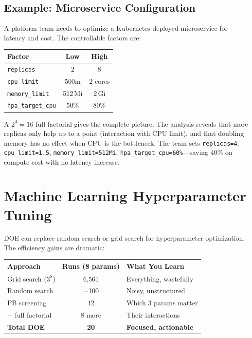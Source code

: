 \documentclass[11pt]{book}
\begin{document}
\subsection{Example: Microservice Configuration}

A platform team needs to optimize a Kubernetes-deployed microservice for latency
and cost. The controllable factors are:

\begin{center}
\begin{tabular}{lcc}
\toprule
Factor & Low & High \\
\midrule
\texttt{replicas} & 2 & 8 \\
\texttt{cpu\_limit} & 500m & 2 cores \\
\texttt{memory\_limit} & 512\,Mi & 2\,Gi \\
\texttt{hpa\_target\_cpu} & 50\% & 80\% \\
\bottomrule
\end{tabular}
\end{center}

A $2^4 = 16$ full factorial gives the complete picture. The analysis reveals
that more replicas only help up to a point (interaction with CPU limit), and
that doubling memory has no effect when CPU is the bottleneck. The team sets
\texttt{replicas=4}, \texttt{cpu\_limit=1.5}, \texttt{memory\_limit=512Mi},
\texttt{hpa\_target\_cpu=60\%}---saving 40\% on compute cost with no latency
increase.

\section{Machine Learning Hyperparameter Tuning}

DOE can replace random search or grid search for hyperparameter optimization.
The efficiency gains are dramatic:

\begin{center}
\begin{tabular}{lcl}
\toprule
Approach & Runs (8 params) & What You Learn \\
\midrule
Grid search ($3^8$) & 6,561 & Everything, wastefully \\
Random search & $\sim$100 & Noisy, unstructured \\
PB screening & 12 & Which 3 params matter \\
\quad + full factorial & 8 more & Their interactions \\
\textbf{Total DOE} & \textbf{20} & \textbf{Focused, actionable} \\
\bottomrule
\end{tabular}
\end{center}
\end{document}
